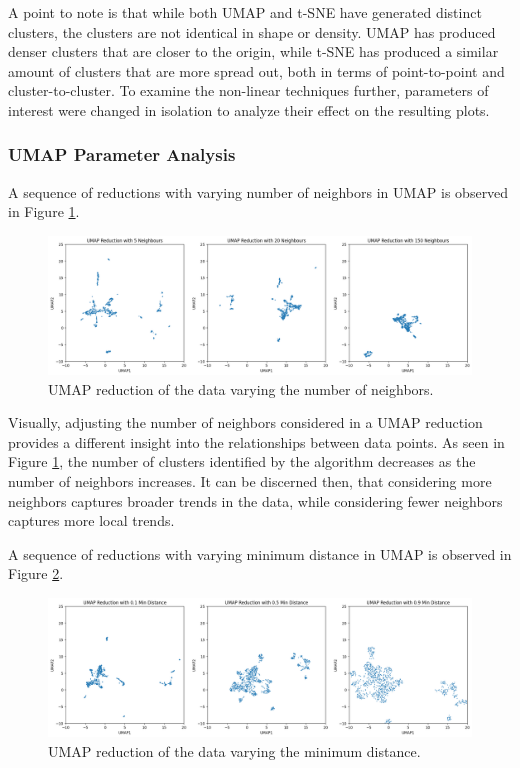 \documentclass[12pt]{article}
\begin{document}
\vspace{-0.5cm}

A point to note is that while both UMAP and t-SNE have generated distinct clusters, the clusters are not identical in shape or density. UMAP has produced denser clusters that are closer to the origin, while t-SNE has produced a similar amount of clusters that are more spread out, both in terms of point-to-point and cluster-to-cluster. To examine the non-linear techniques further, parameters of interest were changed in isolation to analyze their effect on the resulting plots. 

\subsubsection{UMAP Parameter Analysis}
A sequence of reductions with varying number of neighbors in UMAP is observed in Figure \ref{fig:UMAP_vary}.

\begin{figure}[H]
    \centering
    \includegraphics[width=\textwidth]{Images/UMAP_vary.png}
    \caption{UMAP reduction of the data varying the number of neighbors.}
    \label{fig:UMAP_vary}
\end{figure}

\vspace{-0.5cm}

Visually, adjusting the number of neighbors considered in a UMAP reduction provides a different insight into the relationships between data points. As seen in Figure \ref{fig:UMAP_vary}, the number of clusters identified by the algorithm decreases as the number of neighbors increases. It can be discerned then, that considering more neighbors captures broader trends in the data, while considering fewer neighbors captures more local trends.

A sequence of reductions with varying minimum distance in UMAP is observed in Figure \ref{fig:UMAP_vary2}.

\begin{figure}[H]
    \centering
    \includegraphics[width=\textwidth]{Images/UMAP_vary2.png}
    \caption{UMAP reduction of the data varying the minimum distance.}
    \label{fig:UMAP_vary2}
\end{figure}
\end{document}
